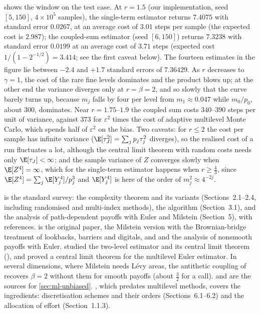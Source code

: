  shows the window on the test case. At $r=1.5$ (our implementation, seed
$[5,150]$, $4\times10^5$ samples), the single-term estimator returns $7.4075$ with standard error
$0.0267$, at an average cost of $3.01$ steps per sample (the expected cost is $2.987$); the
coupled-sum estimator (seed $[6,150]$) returns $7.3238$ with standard error $0.0199$ at an average
cost of $3.71$ steps (expected cost $1/(1-2^{-1/2})=3.414$; see the first caveat below). The
fourteen estimates in the figure lie between $-2.4$ and $+1.7$
standard errors of $7.36429$. As $r$ decreases to $\gamma=1$, the cost of the rare fine levels
dominates and the product blows up; at the other end the variance diverges only at $r=\beta=2$, and
so slowly that the curve barely turns up, because $m_j$ falls by four per level from
$m_1\approx0.047$ while $m_0/p_0$, about $300$, dominates. Near $r=1.75$--$1.9$ the coupled sum
costs $340$--$390$ steps per unit of variance, against $373$ for $\varepsilon^2$ times the cost of
adaptive multilevel Monte Carlo, which spends half of $\varepsilon^2$ on the bias. Two caveats: for
$r\le2$ the cost per sample has infinite variance ($\E[\tau_J^2]=\sum_jp_j\tau_j^2$ diverges), so
the realised cost of a run fluctuates a lot, although the central limit theorem with random costs
needs only $\E[\tau_J]<\infty$; and the sample variance of $Z$ converges slowly when $\E[Z^4]=\infty$,
which for the single-term estimator happens when $r\ge\frac43$, since
$\E[Z^4]=\sum_j\E[Y_j^4]/p_j^3$ and $\E[Y_j^4]$ is here of the order of $m_j^2\approx4^{-2j}$.


\furtherreading
\textcite{giles-acta} is the standard survey: the complexity theorem and its variants
(Sections~2.1--2.4, including randomised and multi-index methods), the algorithm (Section~3.1), and
the analysis of path-dependent payoffs with Euler and Milstein (Section~5), with references.
\textcite{giles-mlmc} is the original paper, \textcite{giles-milstein} the Milstein version with the
Brownian-bridge treatment of lookbacks, barriers and digitals, and \textcite{giles-higham-mao} and
\textcite{avikainen} the analysis of nonsmooth payoffs with Euler. \textcite{kebaier-romberg} studied
the two-level estimator and its central limit theorem (), and
\textcite{ben-alaya-kebaier} proved a central limit theorem for the multilevel Euler estimator. In
several dimensions, where Milstein needs Lévy areas, the antithetic coupling of
\textcite{giles-szpruch} recovers $\beta=2$ without them for smooth payoffs (about $\frac32$ for a
call). \textcite{rhee-glynn} and
\textcite{mcleish-debiasing} are the sources for \cref{sec:ml-unbiased}. \textcite{glasserman-mc},
which predates multilevel methods, covers the ingredients: discretisation schemes and their orders
(Sections~6.1--6.2) and the allocation of effort (Section~1.1.3).
